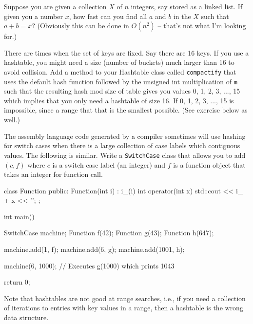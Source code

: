 \begin{ex}
  Suppose you are given a collection $X$ of $n$
  integers, say stored as a linked
  list.
  If given you a number $x$, how fast can you find all $a$ and $b$ in the $X$
  such that $a + b = x$?
  (Obviously this can be done in $O(n^2)$ -- that's not what I'm looking for.)
\end{ex}


\begin{ex} 
  There are times when the set of keys are fixed.
  Say there are 16 keys.
  If you use a hashtable, you might need a size (number of buckets)
  much larger than 16 to avoid collision.
  Add a method to your Hashtable class called \verb!compactify!
  that uses the default hash function followed by the unsigned int
  multiplication of \verb!m! such that
  the resulting hash mod size of table gives you
  values 0, 1, 2, 3, ..., 15 which implies that
  you only need a hashtable of size 16.
  If 0, 1, 2, 3, ..., 15 is impossible, since a range that that is the
  smallest possible.
  (See exercise below as well.)
\end{ex}


\begin{ex}
The assembly language code generated by a compiler sometimes will use
hashing for switch cases when there is a large collection of
case labels which contiguous values.
The following is similar.
Write a \verb!SwitchCase! class that allows you to add
$(c, f)$ where $c$ is a switch case label (an integer) and
$f$ is a function object that takes an integer for
function call.
\begin{console}
class Function
{
public:
    Function(int i) : i_(i) {}
    int operator(int x) { std::cout << i_ + x << '\n'; }
};

int main()
{
    SwitchCase machine;
    Function f(42);
    Function g(43);
    Function h(647);
    
    machine.add(1, f);
    machine.add(6, g);
    machine.add(1001, h);

    machine(6, 1000); // Executes g(1000) which prints 1043
    
    return 0;
}
\end{console}
\end{ex}
  
Note that hashtables are not good at range searches, i.e.,
if you need a collection of iterations to entries with key
values in a range, then a hashtable is the wrong data structure.

\newpage{}
